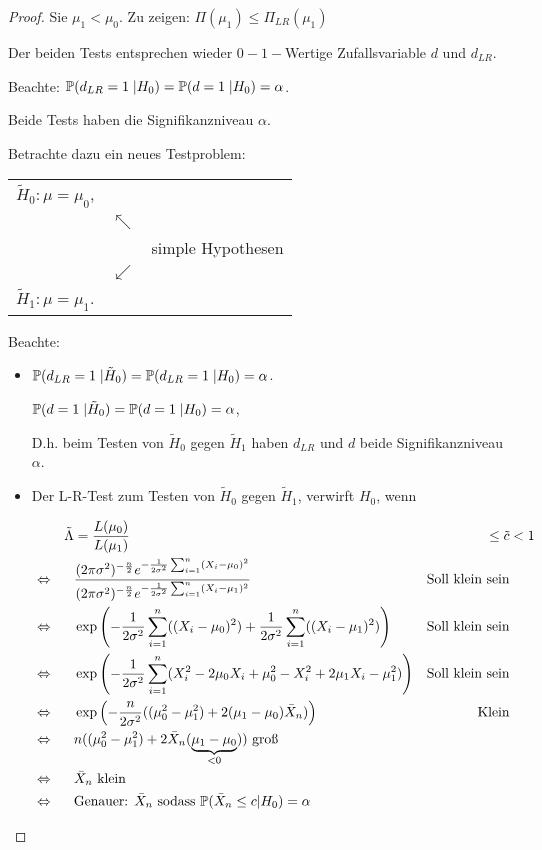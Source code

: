 \documentclass{tstextbook}
\begin{document}
\begin{proof}
	Sie $\mu_1 <  \mu_0 $. Zu zeigen: $\Pi(\mu_1) \leq \Pi_{LR}(\mu_1) $
	
	Der beiden Tests entsprechen wieder $0-1-$Wertige Zufallsvariable $d$ und $d_{LR}$.
	
	Beachte: $ \mathbb P(d_{LR}=1\;|H_0)=\mathbb P(d=1\;|H_0)=\alpha $.
	
	Beide Tests haben die Signifikanzniveau $ \alpha $.
	
	Betrachte dazu ein neues Testproblem:
	
	\begin{center}
		\begin{tabular}{lll}
			$ \tilde{H}_0\colon\mu=\mu_0 $, & & \\
			& $ \nwarrow $ & \\
			&& simple Hypothesen \\
			& $ \swarrow $ & \\
			$ \tilde{H}_1\colon\mu=\mu_1 $.
		\end{tabular}
	\end{center}
	
	Beachte:
	\begin{itemize}
		\item $ \mathbb P(d_{LR}=1\;|\tilde{H}_0) = \mathbb P(d_{LR}=1\;|H_0) = \alpha $. 
		
		$ \mathbb P(d=1\;|\tilde{H}_0) = \mathbb P(d=1\;|H_0) = \alpha $, 
		
		D.h. beim Testen von $ \tilde{H}_0 $ gegen $ \tilde{H}_1 $ haben $ d_{LR} $ und $ d $ beide Signifikanzniveau $ \alpha $. 
		
		 \item Der L-R-Test zum Testen von $ \tilde{H}_0 $ gegen $ \tilde{H}_1 $, verwirft $ H_0 $, wenn 
		 
		\[
		   \begin{aligned}
 	     & & \tilde{\Lambda} & =  \frac{L(\mu_0)}{L(\mu_1)}  & \le \tilde{c} & < 1 \\
 	     & \Leftrightarrow & & \frac{(2\pi\sigma^2)^{-\frac{n}{2}}e^{-\frac{1}{2\sigma^2}\sum_{i=1}^{n}(X_i-\mu_0)^2}}{(2\pi\sigma^2)^{-\frac{n}{2}}e^{-\frac{1}{2\sigma^2}\sum_{i=1}^{n}(X_i-\mu_1)^2}} & \text{Soll klein sein} \\
	      & \Leftrightarrow & & \exp\left(-\frac{1}{2\sigma^2}\sum_{i=1}^{n}( (X_i-\mu_0)^2 ) + \frac{1}{2\sigma^2}\sum_{i=1}^{n}( (X_i-\mu_1)^2 ) \right) & \text{Soll klein sein} \\
	     & \Leftrightarrow & & \exp\left(-\frac{1}{2\sigma^2}\sum_{i=1}^{n}(X_i^2-2\mu_0X_i+\mu_0^2-X_i^2+2\mu_1X_i-\mu_1^2)\right) & \text{Soll klein sein} \\
     	 & \Leftrightarrow & & \exp\left(-\frac{n}{2\sigma^2} ((\mu_0^2 - \mu_1^2) +2 ( \mu_1 - \mu_0 ) \bar{X}_n )  \right) & \text{Klein} \\
      	& \Leftrightarrow & & n((\mu_0^2-\mu_1^2)+2\bar{X}_n(\underbrace{\mu_1-\mu_0}_{<0})) \text{ groß} \\
      	& \Leftrightarrow && \bar{X}_n \text{ klein} \\
	& \Leftrightarrow && \text{Genauer: } \bar{X}_n \text{ sodass } \mathbb P(\bar{X}_n \leq c | H_0 )= \alpha
    \end{aligned}
    \]
		

\end{itemize}
\end{proof}
\end{document}
